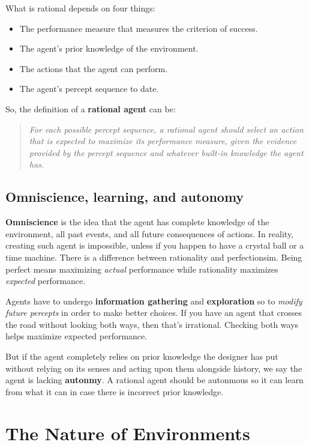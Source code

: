 \documentclass[12pt,a4paper]{article}
\begin{document}
What is rational depends on four things:

\begin{itemize}
    \item The performance measure that measures the criterion of success.
    \item The agent's prior knowledge of the environment.
    \item The actions that the agent can perform.
    \item The agent's percept sequence to date.
\end{itemize}

So, the definition of a \textbf{rational agent} can be:

\begin{quote}
\textit{For each possible percept sequence, a rational agent should select an 
action that is expected to maximize its performance measure, given the evidence 
provided by the percept sequence and whatever built-in knowledge the agent has.}
\end{quote}

\subsection{Omniscience, learning, and autonomy}

\textbf{Omniscience} is the idea that the agent has complete knowledge of the environment, all past events, and all future consequences of actions. In reality, creating such agent is impossible, unless if you happen to have a crystal ball or a time machine. There is a difference between rationality and perfectionsim. Being perfect means maximizing \textit{actual} performance while rationality maximizes \textit{expected} performance.

Agents have to undergo \textbf{information gathering} and \textbf{exploration} so to \textit{modify future percepts} in order to make better choices. If you have an agent that crosses the road without looking both ways, then that's irrational. Checking both ways helps maximize expected performance.

But if the agent completely relies on prior knowledge the designer has put without relying on its senses and acting upon them alongside history, we say the agent is lacking \textbf{autonmy}. A rational agent should be autonmous so it can learn from what it can in case there is incorrect prior knowledge.


\section{The Nature of Environments}
\end{document}
